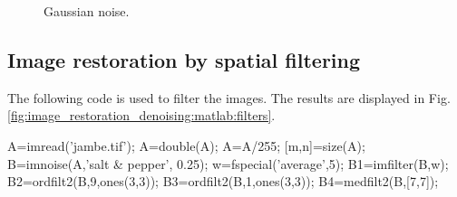 \begin{figure}[htbp]
 \centering
 \hfill

  \caption{Gaussian noise.}
  \label{fig:image_restoration_denoising:matlab:hist_gauss}
\end{figure}

\newpage
\subsection{Image restoration by spatial filtering}
The following code is used to filter the images. The results are displayed in Fig.\ref{fig:image_restoration_denoising:matlab:filters}.
\begin{matlab}
A=imread('jambe.tif');
A=double(A);
A=A/255;
[m,n]=size(A);
B=imnoise(A,'salt & pepper', 0.25);
w=fspecial('average',5);
B1=imfilter(B,w);
B2=ordfilt2(B,9,ones(3,3));
B3=ordfilt2(B,1,ones(3,3));
B4=medfilt2(B,[7,7]);
\end{matlab}

